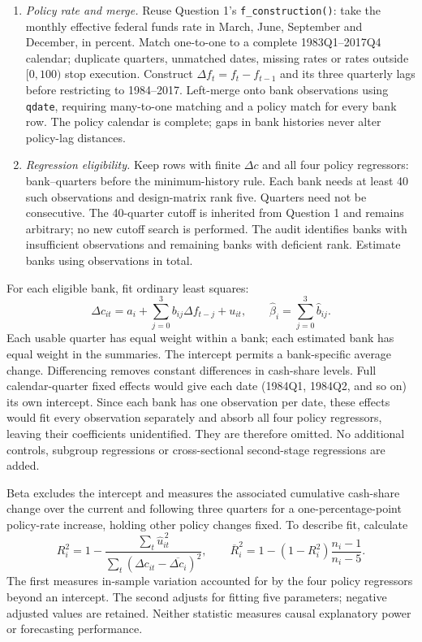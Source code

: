 \documentclass[10pt]{article}
\begin{document}
\begin{enumerate}
\item \textit{Policy rate and merge.} Reuse Question 1's \texttt{f\_construction()}: take the monthly effective federal funds rate in March, June, September and December, in percent. Match one-to-one to a complete 1983Q1--2017Q4 calendar; duplicate quarters, unmatched dates, missing rates or rates outside \([0,100)\) stop execution. Construct \(\Delta f_t=f_t-f_{t-1}\) and its three quarterly lags before restricting to 1984--2017. Left-merge onto bank observations using \texttt{qdate}, requiring many-to-one matching and a policy match for every bank row. The policy calendar is complete; gaps in bank histories never alter policy-lag distances.

\item \textit{Regression eligibility.} Keep rows with finite \(\Delta c\) and all four policy regressors: \QTwoUsableRows{} bank--quarters before the minimum-history rule. Each bank needs at least 40 such observations and design-matrix rank five. Quarters need not be consecutive. The 40-quarter cutoff is inherited from Question 1 and remains arbitrary; no new cutoff search is performed. The audit identifies \QTwoTooFewBanks{} banks with insufficient observations and \QTwoRankDeficientBanks{} remaining banks with deficient rank. Estimate \QTwoEstimatedBanks{} banks using \QTwoEstimationRows{} observations in total.
\end{enumerate}

For each eligible bank, fit ordinary least squares:
\[
\Delta c_{it}=a_i+\sum_{j=0}^{3}b_{ij}\Delta f_{t-j}+u_{it},
\qquad \widehat\beta_i=\sum_{j=0}^{3}\widehat b_{ij}.
\]
Each usable quarter has equal weight within a bank; each estimated bank has equal weight in the summaries. The intercept permits a bank-specific average change. Differencing removes constant differences in cash-share levels. Full calendar-quarter fixed effects would give each date (1984Q1, 1984Q2, and so on) its own intercept. Since each bank has one observation per date, these effects would fit every observation separately and absorb all four policy regressors, leaving their coefficients unidentified. They are therefore omitted. No additional controls, subgroup regressions or cross-sectional second-stage regressions are added.

Beta excludes the intercept and measures the associated cumulative cash-share change over the current and following three quarters for a one-percentage-point policy-rate increase, holding other policy changes fixed. To describe fit, calculate
\[
R_i^2=1-\frac{\sum_t\widehat u_{it}^{\,2}}
 {\sum_t(\Delta c_{it}-\overline{\Delta c_i})^2},
\qquad
\overline R_i^2=1-(1-R_i^2)\frac{n_i-1}{n_i-5}.
\]
The first measures in-sample variation accounted for by the four policy regressors beyond an intercept. The second adjusts for fitting five parameters; negative adjusted values are retained. Neither statistic measures causal explanatory power or forecasting performance.
\end{document}
